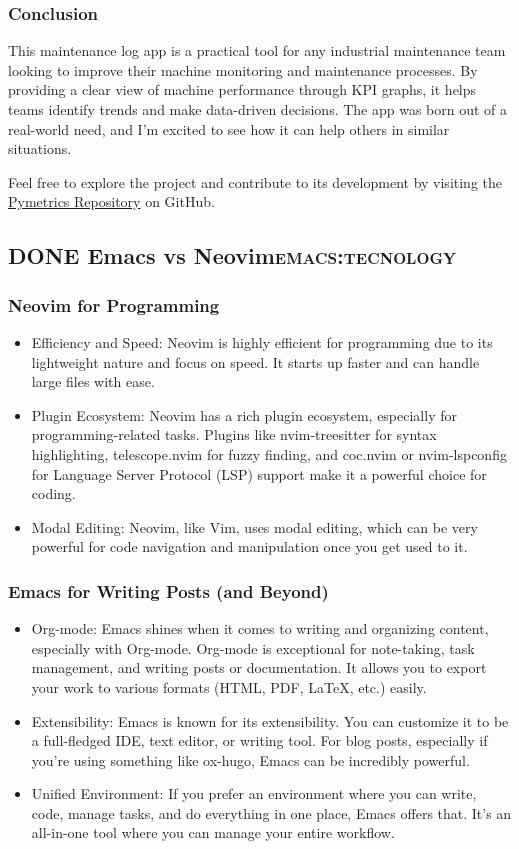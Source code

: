 \documentclass[11pt]{article}
\begin{document}
\subsubsection{Conclusion}
\label{sec:org602162b}
This maintenance log app is a practical tool for any industrial maintenance team looking to improve their machine monitoring and maintenance processes. By providing a clear view of machine performance through KPI graphs, it helps teams identify trends and make data-driven decisions. The app was born out of a real-world need, and I'm excited to see how it can help others in similar situations.

Feel free to explore the project and contribute to its development by visiting the \href{https://github.com/jpachecoxyz/pymetrics}{Pymetrics Repository} on GitHub.
\subsection{{\bfseries\sffamily DONE} Emacs vs Neovim\hfill{}\textsc{emacs:tecnology}}
\label{sec:orgc4cc718}
\subsubsection{Neovim for Programming}
\label{sec:org58c0514}
\begin{itemize}
\item Efficiency and Speed: Neovim is highly efficient for programming due to its lightweight nature and focus on speed. It starts up faster and can handle large files with ease.
\item Plugin Ecosystem: Neovim has a rich plugin ecosystem, especially for programming-related tasks. Plugins like nvim-treesitter for syntax highlighting, telescope.nvim for fuzzy finding, and coc.nvim or nvim-lspconfig for Language Server Protocol (LSP) support make it a powerful choice for coding.
\item Modal Editing: Neovim, like Vim, uses modal editing, which can be very powerful for code navigation and manipulation once you get used to it.
\end{itemize}
\subsubsection{Emacs for Writing Posts (and Beyond)}
\label{sec:orgfeabf94}
\begin{itemize}
\item Org-mode: Emacs shines when it comes to writing and organizing content, especially with Org-mode. Org-mode is exceptional for note-taking, task management, and writing posts or documentation. It allows you to export your work to various formats (HTML, PDF, \LaTeX{}, etc.) easily.
\item Extensibility: Emacs is known for its extensibility. You can customize it to be a full-fledged IDE, text editor, or writing tool. For blog posts, especially if you're using something like ox-hugo, Emacs can be incredibly powerful.
\item Unified Environment: If you prefer an environment where you can write, code, manage tasks, and do everything in one place, Emacs offers that. It's an all-in-one tool where you can manage your entire workflow.
\end{itemize}
\end{document}
